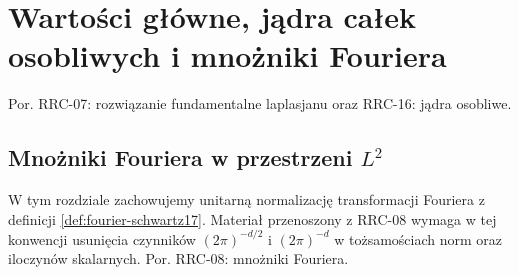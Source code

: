 
\section{Wartości główne, jądra całek osobliwych i mnożniki Fouriera}
\label{sec:dt-singular}
\providecommand{\atlasref}[2]{#2}
Por. \atlasref{PDE-07::thm:pde7-laplace}{RRC-07: rozwiązanie fundamentalne laplasjanu}
oraz \atlasref{PDE-16::lem:pde16-distr-kernel}{RRC-16: jądra osobliwe}.

\subsection{Mnożniki Fouriera w przestrzeni $L^2$}
\label{sec:dt-multipliers-l2}

W tym rozdziale zachowujemy unitarną normalizację
transformacji Fouriera z definicji \ref{def:fourier-schwartz17}.
Materiał przenoszony z RRC-08 wymaga w tej konwencji
usunięcia czynników $(2\pi)^{-d/2}$ i $(2\pi)^{-d}$ w
tożsamościach norm oraz iloczynów skalarnych.
Por. \atlasref{PDE-08::thm:pde8-multiplier}{RRC-08: mnożniki Fouriera}.


